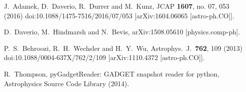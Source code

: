 \documentclass[a4paper, 12 pt]{article}
\begin{document}
\begin{thebibliography}{99}

  J.~Adamek, D.~Daverio, R.~Durrer and M.~Kunz,
  JCAP {\bf 1607}, no. 07, 053 (2016)
  doi:10.1088/1475-7516/2016/07/053
  [arXiv:1604.06065 [astro-ph.CO]].

  D.~Daverio, M.~Hindmarsh and N.~Bevis,
  arXiv:1508.05610 [physics.comp-ph].

  P.~S.~Behroozi, R.~H.~Wechsler and H.~Y.~Wu,
  Astrophys.\ J.\  {\bf 762}, 109 (2013)
  doi:10.1088/0004-637X/762/2/109
  [arXiv:1110.4372 [astro-ph.CO]].

  R.~Thompson,
  pyGadgetReader: GADGET snapshot reader for python,
  Astrophysics Source Code Library (2014).


\end{thebibliography}
\end{document}
